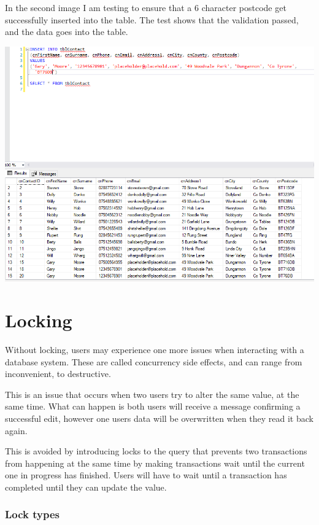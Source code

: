 \documentclass[11pt,a4paper]{scrartcl}
\begin{document}
	In the second image I am testing to ensure that a 6 character postcode get successfully inserted into the table. The test shows that the validation passed, and the data goes into the table.
	
	\begin{center}
		\includegraphics[width=0.9\linewidth]{images/PostcodeConstraintTest2}
	\end{center}
	
	\section{Locking}\label{locking}
	
	Without locking, users may experience one more issues when interacting with a database system. These are called concurrency side effects, and can range from inconvenient, to destructive.
	
	This is an issue that occurs when two users try to alter the same value, at the same time. What can happen is both users will receive a message confirming a successful edit, however one users data will be overwritten when they read it back again.
	
	This is avoided by introducing locks to the query that prevents two transactions from happening at the same time by making transactions wait until the current one in progress has finished. Users will have to wait until a transaction has completed until they can update the value.
	
	\subsubsection*{Lock types}
	
\end{document}
